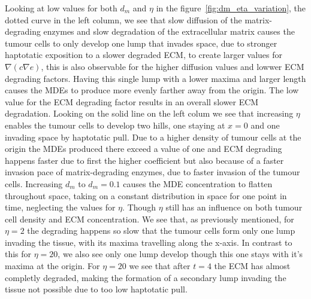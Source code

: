 Looking at low values for both $d_m$ and $\eta$ in the figure~\ref{fig:dm_eta_variation}, the dotted curve in the left column, we see that slow diffusion of the matrix-degrading enzymes and slow degradation of the extracellular matrix causes the tumour cells to only develop one lump that invades space, due to stronger haptotatic exposition to a slower degraded ECM, to create larger values for $\nabla (c \nabla e)$, this is also observable for the higher diffusion values and lowwer ECM degrading factors. Having this single lump with a lower maxima and larger length causes the MDEs to produce more evenly farther away from the origin. The low value for the ECM degrading factor results in an overall slower ECM degradation. Looking on the solid line on the left colum we see that increasing $\eta$ enables the tumour cells to develop two hills, one staying at $x=0$ and one invading space by haptotatic pull. Due to a higher density of tumour cells at the origin the MDEs produced there exceed a value of one and ECM degrading happens faster due to first the higher coefficient but also because of a faster invasion pace of matrix-degrading enzymes, due to faster invasion of the tumour cells. Increasing $d_m$ to $d_m=0.1$ causes the MDE concentration to flatten throughout space, taking on a constant distribution in space for one point in time, neglecting the values for $\eta$. Though $\eta$ still has an influence on both tumour cell density and ECM concentration. We see that, as previously mentioned, for $\eta=2$ the degrading happens so slow that the tumour cells form only one lump invading the tissue, with its maxima travelling along the x-axis. In contrast to this for $\eta=20$, we also see only one lump develop though this one stays with it's maxima at the origin. For $\eta=20$ we see that after $t=4$ the ECM has almost completly degraded, making the formation of a secondary lump invading the tissue not possible due to too low haptotatic pull. 

